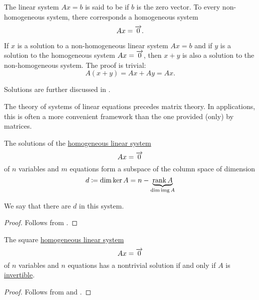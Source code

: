 \begin{remark}
  The linear system \( Ax = b \) is said to be  if \( b \) is the zero vector. To every non-homogeneous system, there corresponds a homogeneous system
  \begin{equation}\label{eq:rem:system_of_equations/homogeneous}
    Ax = \overrightarrow{0}.
  \end{equation}

  If \( x \) is a solution to a non-homogeneous linear system \( Ax = b \) and if \( y \) is a solution to the homogeneous system \( Ax = \overrightarrow{0} \), then \( x + y \) is also a solution to the non-homogeneous system. The proof is trivial:
  \begin{equation*}
    A(x + y) = Ax + Ay = Ax.
  \end{equation*}

  Solutions are further discussed in .

  The theory of systems of linear equations precedes matrix theory. In applications, this is often a more convenient framework than the one provided (only) by matrices.
\end{remark}

\begin{proposition}\label{thm:degrees_of_freedom}
  The solutions of the \hyperref[rem:system_of_equations]{homogeneous linear system}
  \begin{equation*}
    Ax = \overrightarrow{0}
  \end{equation*}
  of \( n \) variables and \( m \) equations form a subspace of the column space of dimension
  \begin{equation*}
    d \coloneqq \dim \ker A = n - \underbrace{ \operatorname{rank} A }_{ \dim \operatorname{img} A }
  \end{equation*}

  We say that there are \( d \)  in this system.
\end{proposition}
\begin{proof}
  Follows from .
\end{proof}

\begin{corollary}\label{thm:homogeneous_linear_equations_solutions}
  The square \hyperref[rem:system_of_equations]{homogeneous linear system}
  \begin{equation*}
    Ax = \overrightarrow{0}
  \end{equation*}
  of \( n \) variables and \( n \) equations has a nontrivial solution if and only if \( A \) is  \hyperref[def:inverse_matrix]{invertible}.
\end{corollary}
\begin{proof}
  Follows from  and .
\end{proof}

